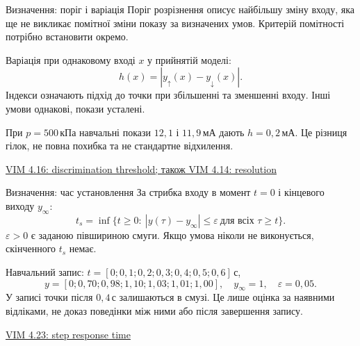 \documentclass[aspectratio=169,11pt]{beamer}
\newcommand{\unit}[1]{\,\text{#1}}
\newcommand{\src}[2]{\par\vfill{\tiny\href{#1}{#2}}}
\begin{document}
\begin{frame}{Визначення: поріг і варіація}
Поріг розрізнення описує найбільшу зміну входу, яка ще не викликає помітної зміни показу за визначених умов. Критерій помітності потрібно встановити окремо.
\medskip

Варіація при однаковому вході $x$ у прийнятій моделі:
\[
h(x)=\left|y_{\uparrow}(x)-y_{\downarrow}(x)\right|.
\]
Індекси означають підхід до точки при збільшенні та зменшенні входу. Інші умови однакові, покази усталені.
\medskip

При $p=500\unit{кПа}$ навчальні покази $12{,}1$ і $11{,}9\unit{мА}$ дають $h=0{,}2\unit{мА}$. Це різниця гілок, не повна похибка та не стандартне відхилення.
\src{https://jcgm.bipm.org/vim/en/4.16.html}{VIM 4.16: discrimination threshold; також VIM 4.14: resolution}
\end{frame}

\begin{frame}{Визначення: час установлення}
За стрибка входу в момент $t=0$ і кінцевого виходу $y_\infty$:
\[
t_s=\inf\{t\ge0:\ |y(\tau)-y_\infty|\le\varepsilon\ \text{для всіх }\tau\ge t\}.
\]
$\varepsilon>0$ є заданою півшириною смуги. Якщо умова ніколи не виконується, скінченного $t_s$ немає.
\medskip

Навчальний запис: $t=[0;0{,}1;0{,}2;0{,}3;0{,}4;0{,}5;0{,}6]\unit{с}$,
\[
y=[0;0{,}70;0{,}98;1{,}10;1{,}03;1{,}01;1{,}00],\quad
y_\infty=1,\quad\varepsilon=0{,}05.
\]
У записі точки після $0{,}4\unit{с}$ залишаються в смузі. Це лише оцінка за наявними відліками, не доказ поведінки між ними або після завершення запису.
\src{https://jcgm.bipm.org/vim/en/4.23.html}{VIM 4.23: step response time}
\end{frame}
\end{document}
